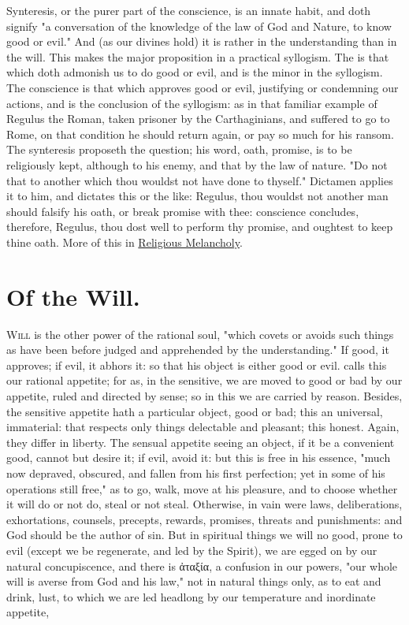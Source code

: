 Synteresis, or the purer part of the conscience, is an innate habit, and doth
signify "a conversation of the knowledge of the law of God and Nature, to know
good or evil." And (as our divines hold) it is rather in the understanding than
in the will. This makes the major proposition in a practical syllogism. The
 is that which doth admonish us to do good or evil, and
is the minor in the syllogism. The conscience is that which approves good or
evil, justifying or condemning our actions, and is the conclusion of the
syllogism: as in that familiar example of Regulus the Roman, taken prisoner by
the Carthaginians, and suffered to go to Rome, on that condition he should
return again, or pay so much for his ransom. The synteresis proposeth the
question; his word, oath, promise, is to be religiously kept, although to his
enemy, and that by the law of nature. "Do not that to
another which thou wouldst not have done to thyself." Dictamen applies it to
him, and dictates this or the like: Regulus, thou wouldst not another man
should falsify his oath, or break promise with thee: conscience concludes,
therefore, Regulus, thou dost well to perform thy promise, and oughtest to keep
thine oath. More of this in \hyperref[ch:religious-melancholy]{Religious
Melancholy}.

\section{Of the Will.}

\lettrine{W}{ill} is the other power of the rational soul,
"which covets or avoids such things as have been before
judged and apprehended by the understanding." If good, it approves; if evil, it
abhors it: so that his object is either good or evil. \Aristotle{} calls this our
rational appetite; for as, in the sensitive, we are moved to good or bad by our
appetite, ruled and directed by sense; so in this we are carried by reason.
Besides, the sensitive appetite hath a particular object, good or bad; this an
universal, immaterial: that respects only things delectable and pleasant; this
honest. Again, they differ in liberty. The sensual appetite seeing an object,
if it be a convenient good, cannot but desire it; if evil, avoid it: but this
is free in his essence, "much now depraved, obscured, and
fallen from his first perfection; yet in some of his operations still free," as
to go, walk, move at his pleasure, and to choose whether it will do or not do,
steal or not steal. Otherwise, in vain were laws, deliberations, exhortations,
counsels, precepts, rewards, promises, threats and punishments: and God should
be the author of sin. But in spiritual things we will no
good, prone to evil (except we be regenerate, and led by the Spirit), we are
egged on by our natural concupiscence, and there is \textgreek{ἀταξία}, a
confusion in our powers, "our whole will is averse from
God and his law," not in natural things only, as to eat and drink, lust, to
which we are led headlong by our temperature and inordinate appetite,

